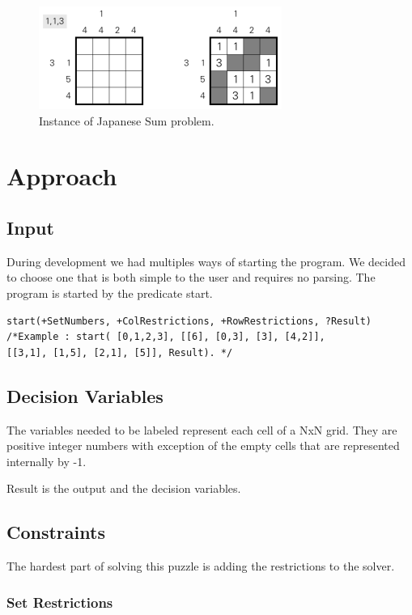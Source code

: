 \documentclass{llncs}
\begin{document}
\vspace{1.5cm}
\begin{figure}
  \centering
  \includegraphics[]{japsum-example.png}
\caption{Instance of Japanese Sum problem.}
  \label{fig:jp_sums}
\end{figure}




\section{Approach}

\subsection{Input}
During development we had multiples ways of starting the program. We decided to choose one that is both simple to the user and requires no parsing. The program is started by the predicate start.

	\begin{verbatim}
start(+SetNumbers, +ColRestrictions, +RowRestrictions, ?Result)
/*Example : start( [0,1,2,3], [[6], [0,3], [3], [4,2]],
[[3,1], [1,5], [2,1], [5]], Result). */
	\end{verbatim}
    
\subsection{Decision Variables}

The variables needed to be labeled represent each cell of a NxN grid. They are positive integer numbers with exception of the empty cells that are represented internally by -1.

Result is the output and the decision variables.

\subsection{Constraints}

The hardest part of solving this puzzle is adding the restrictions to the solver. 

\subsubsection{Set Restrictions}
\end{document}
